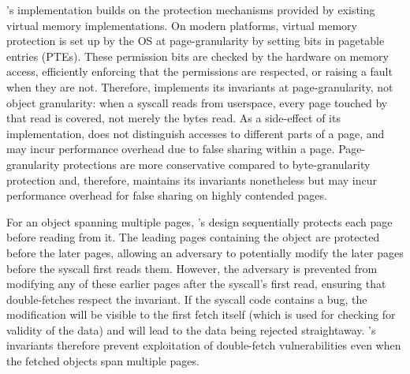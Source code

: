 \documentclass[letterpaper,twocolumn,10pt, anonymous]{article}
\begin{document}
\tiktok's implementation builds on the protection mechanisms provided by 
existing virtual memory implementations.
On modern platforms, virtual memory protection is set up by the OS at
page-granularity by setting bits in pagetable entries (PTEs).
These permission bits are checked by the hardware on memory access, 
efficiently enforcing that the permissions are respected, or raising 
a fault when they are not.
Therefore, \tiktok implements its invariants at page-granularity, not object 
granularity: when a syscall reads from userspace, every page touched by that 
read is covered, not merely the bytes read.
As a side-effect of its implementation, \tiktok does not distinguish
accesses to different parts of a page, and may incur performance overhead due
to false sharing within a page. 
Page-granularity protections are more conservative compared to byte-granularity
protection and, therefore, \tiktok maintains its invariants nonetheless but may
incur performance overhead for false sharing on highly contended pages.

For an object spanning multiple pages, \tiktok's design sequentially 
protects each page before reading from it.
The leading pages containing the object are protected before the
later pages, allowing an adversary to potentially modify the later 
pages before the syscall first reads them.
However, the adversary is prevented from modifying any of these earlier pages
after the syscall's first read, ensuring that double-fetches respect
the invariant.
If the syscall code contains a \tocttou bug, the modification will
be visible to the first fetch itself (which is used for checking for 
validity of the data) and will lead to the data being rejected 
straightaway.
\tiktok's invariants therefore prevent exploitation of double-fetch
vulnerabilities even when the fetched objects span multiple pages.
\end{document}
